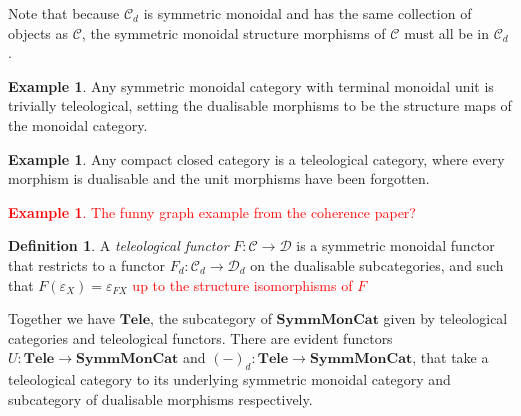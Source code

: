 \documentclass[11pt,a4paper]{article}
\theoremstyle{plain}
\theoremstyle{definition}
\newtheorem{definition}[theorem]{Definition}
\newtheorem{example}[theorem]{Example}
\newtheorem{remark}[theorem]{Remark}
\newcommand{\C}{\mathscr{C}}
\newcommand{\D}{\mathscr{D}}
\newcommand{\SymmMonCat}{\mathbf{SymmMonCat}}
\newcommand{\Tele}{\mathbf{Tele}}
\newcommand{\todo}[1]{\textcolor{red}{\small #1}}
\begin{document}

Note that because $\C_d$ is symmetric monoidal and has the same collection of objects as $\C$, the symmetric monoidal structure morphisms of $\C$ must all be in $\C_d$.

\begin{example}
  Any symmetric monoidal category with terminal monoidal unit is trivially teleological, setting the dualisable morphisms to be the structure maps of the monoidal category.
\end{example}

\begin{example}
  Any compact closed category is a teleological category, where every morphism is dualisable and the unit morphisms have been forgotten.
\end{example}

\todo{\begin{example}
    The funny graph example from the coherence paper?
  \end{example}}

\begin{definition}
  A \emph{teleological functor} $F : \C \to \D$ is a symmetric monoidal functor that restricts to a functor $F_d : \C_d \to \D_d$ on the dualisable subcategories, and such that $F(\varepsilon_X) = \varepsilon_{FX}$ \todo{up to the structure isomorphisms of $F$}
\end{definition}

Together we have $\Tele$, the subcategory of $\SymmMonCat$ given by teleological categories and teleological functors. There are evident functors $U : \Tele \to \SymmMonCat$ and ${(-)}_d : \Tele \to \SymmMonCat$, that take a teleological category to its underlying symmetric monoidal category and subcategory of dualisable morphisms respectively.
\end{document}

